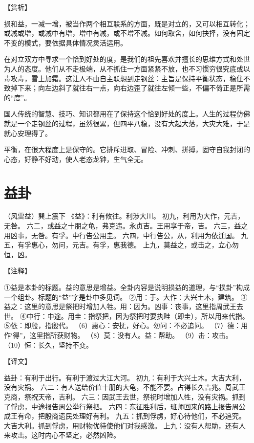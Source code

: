 \documentclass[a4paper,12pt,UTF8,twoside]{ctexbook}
\begin{document}
【赏析】

损和益，一减一增，被当作两个相互联系的方面，既是对立的，又可以相互转化；或减或增，或减中有增，增中有减，或不增不减。如何取舍，如何抉择，没有固定不变的模式，要依据具体情况灵活运用。

在对立双方中寻求一个恰到好处的度，是我们的祖先喜欢并擅长的思维方式和处世为人的态度。他们从不走极端，从不抓住一方面紧紧不放，也不习惯穷很究底或以毒攻毒，雪上加霜。这让人不由自主联想到走钢丝：主旨是保持平衡状态，稳住不致掉下来；向左边斜了就往右一点，向右边歪了就往左倾一些，不偏不倚正是所需的“度”。

国人传统的智慧、技巧、知识都用在了保持这个恰到好处的度上。人生的过程仿佛就是一个走钢丝的过程，虽然很累，但四平八稳，没有大起大落，大灾大难，于是就心安理得了。

平衡，在很大程度上是保守的。它排斥进取、冒险、冲刺、拼搏，固守自我封闭的心态，好静不好动，使人老态龙钟，生气全无。

\chapter{益卦}

（风雷益）巽上震下
《益》：利有攸往。利涉大川。
初九，利用为大作，元吉，无咎。
六二，或益之十朋之龟，弗克违。永贞吉。王用享于帝，吉。
六三，益之用凶事，无咎。有孚。中行告公用圭。
六四，中行告公，从，利用为依迁国。
九五，有孚惠心，勿问，元吉。有孚，惠我德。
上九，莫益之，或击之，立心勿恒，凶。

【注释】

①益是本卦的标题。益的意思是增益。全卦内容是说明损益的道理，与“损卦”构成一个组卦。标题的“益”字是卦中多见词。
②用：于。大作：大兴土木，建筑。
③益之：这里的意思是祭把时增加人牲。用：因为。凶事：丧事，这里指周武王去世。
④中行：中途。用圭：指祭把，因为祭把时要执畦（即圭），所以用来代指。
⑤依：即殷，指殷代。
（6）惠心：安抚，好心。勿问：不必追问。
（7）德：用作‘得”，这里指所获财物。
（8）莫：没有人。益：帮助。
（9）击：攻击。
（10）恒：长久，坚持不变。

【译文】

益卦：有利于出行。有利于渡过大江大河。
初九：有利于大兴土木。大吉大利，没有灾祸。
六二：有人送给价值十朋的大龟，不能不要。占得长久吉兆。周武王克商，祭祝天帝，吉利。
六三：因武王去世，祭祝时增加人牲，没有灾祸。抓到了俘虏，中途报告周公举行祭把。
六四：东征胜利后，班师回来的路上报告周公成王有命，把殷商遗民处理好有利。
九五：抓到俘虏，好心待他们，不必追究。大吉大利。抓到俘虏，用财物优待使他们对我感激。
上九：没有人帮助，还有人来攻击。这时内心不坚定，必然凶险。
\end{document}
